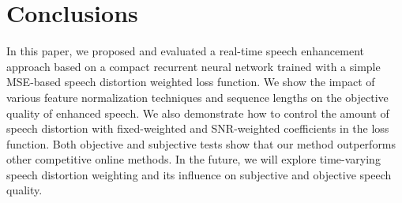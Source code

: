 \documentclass{article}
\begin{document}
\vspace{-2mm}
\section{Conclusions}
\vspace{-2mm}
\label{sec:con}
In this paper, we proposed and evaluated a real-time speech enhancement approach based on a compact recurrent neural network trained with a simple MSE-based speech distortion weighted loss function. We show the impact of various feature normalization techniques and sequence lengths on the objective quality of enhanced speech. We also demonstrate how to control the amount of speech distortion with fixed-weighted and SNR-weighted coefficients in the loss function. Both objective and subjective tests show that our method outperforms other competitive online methods. In the future, we will explore time-varying speech distortion weighting and its influence on subjective and objective speech quality.






\pagebreak



\end{document}
